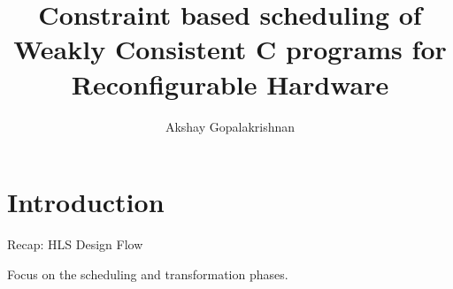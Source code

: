 \documentclass[notes, xcolor=dvipsnames]{beamer}
\title{Constraint based scheduling of Weakly Consistent C programs for Reconfigurable Hardware}
\author{Akshay Gopalakrishnan}
\begin{document}
    
    \begin{frame}

        \maketitle

    \end{frame}

    \section{Introduction}
    \begin{frame}{Recap: HLS Design Flow}

        \begin{figure}
        \end{figure}

        Focus on the scheduling and transformation phases.
        
    \end{frame}
\end{document}
